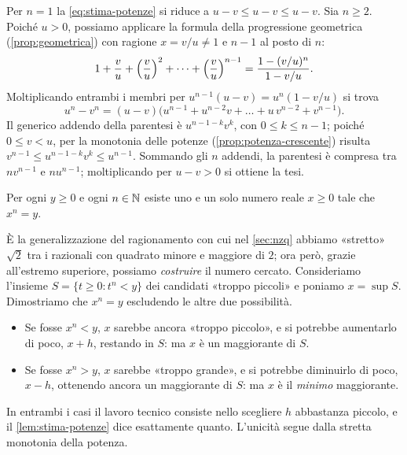 \begin{dimostrazione}
Per $n=1$ la \eqref{eq:stima-potenze} si riduce a $u-v\le u-v\le u-v$. Sia $n\ge2$.
Poiché $u>0$, possiamo applicare la formula della progressione geometrica
(\cref{prop:geometrica}) con ragione $x=v/u\neq1$ e $n-1$ al posto di $n$:
\[
  1+\frac vu+\Bigl(\frac vu\Bigr)^{2}+\dots+\Bigl(\frac vu\Bigr)^{n-1}
  =\frac{1-(v/u)^{n}}{1-v/u}.
\]
Moltiplicando entrambi i membri per $u^{n-1}(u-v)=u^{n}(1-v/u)$ si trova
\begin{equation}\label{eq:scomposizione-potenze}
  u^{n}-v^{n}=(u-v)\bigl(u^{n-1}+u^{n-2}v+\dots+u\,v^{n-2}+v^{n-1}\bigr).
\end{equation}
Il generico addendo della parentesi è $u^{n-1-k}v^{k}$, con $0\le k\le n-1$; poiché
$0\le v<u$, per la monotonia delle potenze (\cref{prop:potenza-crescente}) risulta
$v^{n-1}\le u^{n-1-k}v^{k}\le u^{n-1}$. Sommando gli $n$ addendi, la parentesi è compresa
tra $n v^{n-1}$ e $n u^{n-1}$; moltiplicando per $u-v>0$ si ottiene la tesi.
\end{dimostrazione}

\begin{teorema}\label{teo:radice-n}
Per ogni $y\ge0$ e ogni $n\in\mathbb{N}$ esiste uno e un solo numero reale $x\ge0$ tale che
$x^{n}=y$.
\end{teorema}

\begin{schema}
\end{schema}

\begin{strategia}
È la generalizzazione del ragionamento con cui nel \cref{sec:nzq} abbiamo «stretto»
$\sqrt2$ tra i razionali con quadrato minore e maggiore di $2$; ora però, grazie
all'estremo superiore, possiamo \emph{costruire} il numero cercato. Consideriamo
l'insieme $S=\{t\ge0 : t^{n}<y\}$ dei candidati «troppo piccoli» e poniamo $x=\sup S$.
Dimostriamo che $x^{n}=y$ escludendo le altre due possibilità.
\begin{itemize}
  \item Se fosse $x^{n}<y$, $x$ sarebbe ancora «troppo piccolo», e si potrebbe aumentarlo
  di poco, $x+h$, restando in $S$: ma $x$ è un maggiorante di $S$.
  \item Se fosse $x^{n}>y$, $x$ sarebbe «troppo grande», e si potrebbe diminuirlo di
  poco, $x-h$, ottenendo ancora un maggiorante di $S$: ma $x$ è il \emph{minimo}
  maggiorante.
\end{itemize}
In entrambi i casi il lavoro tecnico consiste nello scegliere $h$ abbastanza piccolo,
e il \cref{lem:stima-potenze} dice esattamente quanto. L'unicità segue dalla stretta
monotonia della potenza.
\end{strategia}

